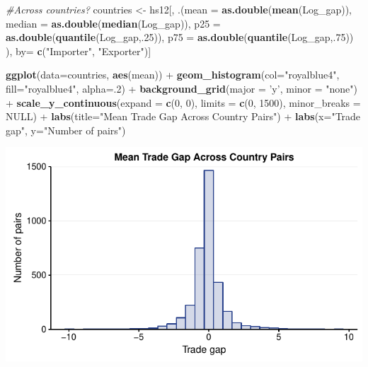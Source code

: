 \documentclass[10pt,]{article}
\newenvironment{Shaded}{\begin{snugshade}}{\end{snugshade}}
\newcommand{\KeywordTok}[1]{\textcolor[rgb]{0.13,0.29,0.53}{\textbf{{#1}}}}
\newcommand{\DataTypeTok}[1]{\textcolor[rgb]{0.13,0.29,0.53}{{#1}}}
\newcommand{\DecValTok}[1]{\textcolor[rgb]{0.00,0.00,0.81}{{#1}}}
\newcommand{\StringTok}[1]{\textcolor[rgb]{0.31,0.60,0.02}{{#1}}}
\newcommand{\CommentTok}[1]{\textcolor[rgb]{0.56,0.35,0.01}{\textit{{#1}}}}
\newcommand{\OtherTok}[1]{\textcolor[rgb]{0.56,0.35,0.01}{{#1}}}
\newcommand{\NormalTok}[1]{{#1}}
\begin{document}
\begin{Shaded}
\begin{Highlighting}[]
\CommentTok{#Across countries?}
\NormalTok{countries <-}\StringTok{ }\NormalTok{hs12[, .(}\DataTypeTok{mean =} \KeywordTok{as.double}\NormalTok{(}\KeywordTok{mean}\NormalTok{(Log_gap)),}
                      \DataTypeTok{median =} \KeywordTok{as.double}\NormalTok{(}\KeywordTok{median}\NormalTok{(Log_gap)),}
                      \DataTypeTok{p25 =} \KeywordTok{as.double}\NormalTok{(}\KeywordTok{quantile}\NormalTok{(Log_gap,.}\DecValTok{25}\NormalTok{)),}
                      \DataTypeTok{p75 =} \KeywordTok{as.double}\NormalTok{(}\KeywordTok{quantile}\NormalTok{(Log_gap,.}\DecValTok{75}\NormalTok{))}
\NormalTok{),}
\NormalTok{by=}\StringTok{ }\KeywordTok{c}\NormalTok{(}\StringTok{"Importer"}\NormalTok{, }\StringTok{"Exporter"}\NormalTok{)]}

\KeywordTok{ggplot}\NormalTok{(}\DataTypeTok{data=}\NormalTok{countries, }\KeywordTok{aes}\NormalTok{(mean)) +}
\StringTok{  }\KeywordTok{geom_histogram}\NormalTok{(}\DataTypeTok{col=}\StringTok{"royalblue4"}\NormalTok{,}
                 \DataTypeTok{fill=}\StringTok{"royalblue4"}\NormalTok{,}
                 \DataTypeTok{alpha=}\NormalTok{.}\DecValTok{2}\NormalTok{) +}
\StringTok{  }\KeywordTok{background_grid}\NormalTok{(}\DataTypeTok{major =} \StringTok{'y'}\NormalTok{, }\DataTypeTok{minor =} \StringTok{"none"}\NormalTok{) +}
\StringTok{  }\KeywordTok{scale_y_continuous}\NormalTok{(}\DataTypeTok{expand =} \KeywordTok{c}\NormalTok{(}\DecValTok{0}\NormalTok{, }\DecValTok{0}\NormalTok{), }\DataTypeTok{limits =} \KeywordTok{c}\NormalTok{(}\DecValTok{0}\NormalTok{, }\DecValTok{1500}\NormalTok{),  }\DataTypeTok{minor_breaks =} \OtherTok{NULL}\NormalTok{) +}
\StringTok{  }\KeywordTok{labs}\NormalTok{(}\DataTypeTok{title=}\StringTok{"Mean Trade Gap Across Country Pairs"}\NormalTok{) +}
\StringTok{  }\KeywordTok{labs}\NormalTok{(}\DataTypeTok{x=}\StringTok{"Trade gap"}\NormalTok{, }\DataTypeTok{y=}\StringTok{"Number of pairs"}\NormalTok{)}
\end{Highlighting}
\end{Shaded}

\begin{center}\includegraphics{Figs/value_pairs-1} \end{center}
\end{document}
